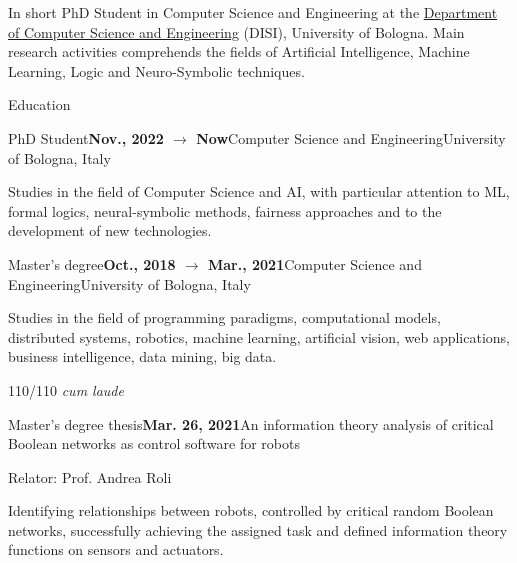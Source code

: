 \documentclass{resume} %
\begin{document}
    
    \begin{rSection}{In short}
        PhD Student in Computer Science and Engineering at the \href{https://disi.unibo.it/it}{Department of Computer Science and Engineering} (DISI), University of Bologna.
        Main research activities comprehends the fields of Artificial Intelligence, Machine Learning, Logic and Neuro-Symbolic techniques.
        
    \end{rSection}
    
    
    \begin{rSection}{Education}
        
        \begin{rSubsection}{PhD Student}{\textbf{Nov., 2022 $\rightarrow$ Now}}{Computer Science and Engineering}{University of Bologna, Italy}
            \item Studies in the field of Computer Science and AI, with particular attention to ML, formal logics, neural-symbolic methods, fairness approaches and to the development of new technologies.
        \end{rSubsection}
        
        
        \begin{rSubsection}{Master's degree}{\textbf{Oct., 2018 $\rightarrow$ Mar., 2021}}{Computer Science and Engineering}{University of Bologna, Italy}
            \item Studies in the field of programming paradigms, computational models, distributed systems, robotics, machine learning, artificial vision, web applications, business intelligence, data mining, big data.
            
            \item 110/110 \emph{cum laude}
        \end{rSubsection}
        \begin{rSubsection}{Master's degree thesis}{\textbf{Mar. 26, 2021}}{An information theory analysis of critical Boolean networks as control software for robots}{\begin{flushright}
                    Relator: Prof. Andrea Roli
            \end{flushright}}
            \item Identifying relationships between robots, controlled by critical random Boolean networks, successfully achieving the assigned task and defined information theory functions on sensors and actuators.
            

\end{rSubsection}
\end{rSection}
\end{document}
